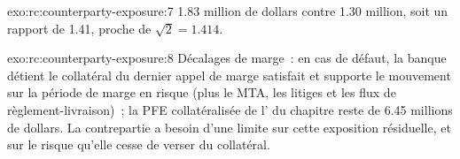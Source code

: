 \begin{solution}{exo:rc:counterparty-exposure:7}
1.83 million de dollars contre 1.30 million, soit un rapport de 1.41, proche de $\sqrt2 = 1.414$.
\end{solution}

\begin{solution}{exo:rc:counterparty-exposure:8}
Décalages de marge~: en cas de défaut, la banque détient le collatéral du dernier appel de marge satisfait et supporte
le mouvement sur la période de marge en risque (plus le MTA, les litiges et les flux de règlement-livraison)~; la
PFE collatéralisée de l' du chapitre reste de 6.45 millions de dollars. La contrepartie
a besoin d'une limite sur cette exposition résiduelle, et sur le risque qu'elle cesse de verser du collatéral.
\end{solution}


